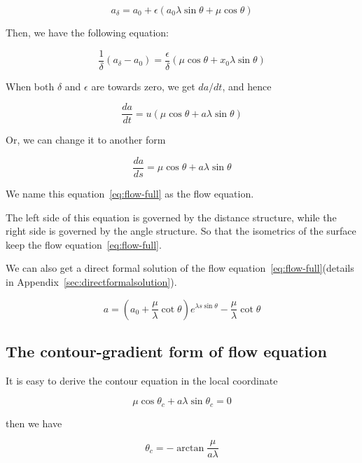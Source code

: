 \documentclass[12pt]{article}
\begin{document}
\[
    a_{\delta} = a_0 + \epsilon (a_0 \lambda \sin \theta + \mu \cos \theta)
\]

Then, we have the following equation:

\[
    \frac{1}{\delta} (a_{\delta} - a_0) = \frac{\epsilon}{\delta} (\mu \cos \theta + x_0 \lambda \sin \theta)
\]

When both $\delta$ and $\epsilon$ are towards zero, we get $da / dt$, and hence

\[
    \frac{da}{dt} = u (\mu \cos \theta + a \lambda \sin \theta)
\]

Or, we can change it to another form

\begin{equation}
    \frac{da}{ds} = \mu \cos \theta + a \lambda \sin \theta\label{eq:flow-full}
\end{equation}

We name this equation~\eqref{eq:flow-full} as the flow equation.

The left side of this equation is governed by the distance structure, while the right side is governed by the angle structure.
So that the isometrics of the surface keep the flow equation~\eqref{eq:flow-full}.

We can also get a direct formal solution of the flow equation~\eqref{eq:flow-full}(details in Appendix~\ref{sec:directformalsolution}).

\begin{equation}
   a = (a_0 + \frac{\mu}{\lambda} \cot \theta) e^{\lambda s \sin \theta} - \frac{\mu}{\lambda} \cot \theta\label{eq:solution-full}
\end{equation}

\subsection{The contour-gradient form of flow equation}\label{subsec:the-contour-gradient-form-full}

It is easy to derive the contour equation in the local coordinate

\begin{equation}
    \mu \cos \theta_c + a \lambda \sin \theta_c = 0\label{eq:contour-full}
\end{equation}

then we have

\begin{equation}
    \theta_c = - \arctan \frac{\mu}{a \lambda}\label{eq:contourangle-full}
\end{equation}
\end{document}
